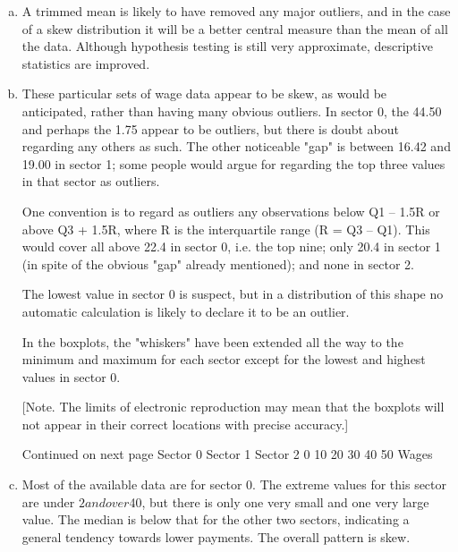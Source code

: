 \documentclass[a4paper,12pt]{article}
\begin{document}
\begin{enumerate}[(a)]
\item A trimmed mean is likely to have removed any major outliers, and in the case of a skew distribution it will be a better central measure than the mean of all the data.  Although hypothesis testing is still very approximate, descriptive statistics are improved. 
 
 
\item These particular sets of wage data appear to be skew, as would be anticipated, rather than having many obvious outliers.  In sector 0, the 44.50 and perhaps the 1.75 appear to be outliers, but there is doubt about regarding any others as such.  The other noticeable "gap" is between 16.42 and 19.00 in sector 1;  some people would argue for regarding the top three values in that sector as outliers. 
 
One convention is to regard as outliers any observations below Q1 – 1.5R or above Q3 + 1.5R, where R is the interquartile range (R = Q3 – Q1).  This would cover all above 22.4 in sector 0, i.e. the top nine;  only 20.4 in sector 1 (in spite of the obvious "gap" already mentioned);  and none in sector 2. 
 
The lowest value in sector 0 is suspect, but in a distribution of this shape no automatic calculation is likely to declare it to be an outlier. 
 
In the boxplots, the "whiskers" have been extended all the way to the minimum and maximum for each sector except for the lowest and highest values in sector 0. 
 
 
 
 
 
 
 
 
 
 
[Note.  The limits of electronic reproduction may mean that the boxplots will not appear in their correct locations with precise accuracy.] 
 
 
 
Continued on next page 
Sector 0
Sector 1
Sector 2
0 10 20 30 40 50 Wages 

 
 
\item Most of the available data are for sector 0.  The extreme values for this sector are under $2 and over $40, but there is only one very small and one very large value.  The median is below that for the other two sectors, indicating a general tendency towards lower payments.  The overall pattern is skew. 
 

\end{enumerate}
\end{document}
